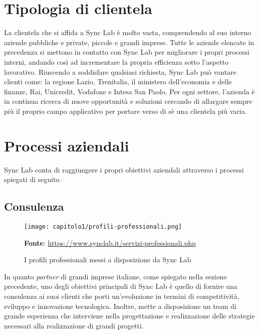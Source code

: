 \section{Tipologia di clientela}
La clientela che si affida a Sync Lab è molto vasta, comprendendo al suo interno aziende pubbliche e private, piccole e grandi imprese. Tutte le aziende elencate in precedenza si mettono in contatto con Sync Lab per migliorare i propri processi interni, andando così ad incrementare la propria efficienza sotto l'aspetto lavorativo. Riuscendo a soddisfare qualsiasi richiesta, Sync Lab può vantare clienti come: la regione Lazio, Trenitalia, il ministero dell'economia e delle finanze, Rai, Unicredit, Vodafone e Intesa San Paolo. Per ogni settore, l'azienda è in continua ricerca di nuove opportunità e soluzioni cercando di allargare sempre più il proprio campo applicativo per portare verso di sè una clientela più varia.

\section{Processi aziendali}
Sync Lab conta di raggiungere i propri obiettivi aziendali attraverso i processi spiegati di seguito.

\subsection{Consulenza}

\begin{figure}[!h]
  \centering
  \texttt{[image: capitolo1/profili-professionali.png]}
  \caption{I profili professionali messi a disposizione da Sync Lab}
  \textbf{Fonte}: \href{https://www.synclab.it/servizi-professionali.php}{https://www.synclab.it/servizi-professionali.php}
\end{figure}

In quanto \textit{partner} di grandi imprese italiane, come spiegato nella sezione precedente, uno degli obiettivi principali di Sync Lab è quello di fornire una consulenza ai suoi clienti che porti un'evoluzione in termini di competitività, sviluppo e innovazione tecnologica. Inoltre, mette a disposizione un team di grande esperienza che interviene nella progettazione e realizzazione delle strategie necessari alla realizzazione di grandi progetti.

